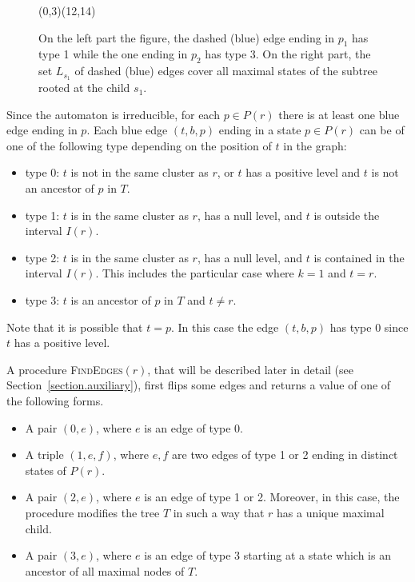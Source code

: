 \documentclass[11pt,a4paper]{article}
\def\T{{T}}
\begin{document}
\begin{figure}[htbp]
{\begin{VCPicture}{(0,3)(12,14)}
{
}
\end{VCPicture}}
        \caption{On the left part the figure, the dashed (blue) edge
          ending in $p_1$ has type 1 while the one ending in $p_2$ has
          type 3. On the right part, the set $L_{s_1}$ of dashed
          (blue) edges cover all maximal states of the subtree rooted
          at the child $s_1$.  }\label{figure.tree}
\end{figure}


Since the automaton is irreducible, for each $p \in P(r)$ there is at
least one blue edge ending in $p$. Each blue edge $(t,b,p)$ ending in
a state $p \in P(r)$ can be of one of the following type depending
on the position of $t$ in the graph:
\begin{itemize}
\item type 0: $t$ is not in the same cluster as $r$, or $t$ has a
  positive level and $t$ is not an ancestor of $p$ in $\T$.
\item type 1: $t$ is in the same cluster as $r$, has a null level, and
  $t$ is outside the interval $I(r)$.
\item type 2: $t$ is in the same cluster as $r$, has a null level, and
  $t$ is contained in the interval $I(r)$. This includes the
  particular case where $k=1$ and $t=r$.
\item type 3: $t$ is an ancestor of $p$ in $\T$ and $t \neq r$.
\end{itemize}
Note that it is possible that $t=p$. In this case the edge $(t,b,p)$
has type 0 since $t$ has a positive level.

A procedure \textsc{FindEdges}$(r)$, that will be described later in
detail (see Section~\ref{section.auxiliary}), first flips some edges and returns
a value of one of the following forms.
\begin{itemize} 
\item A pair $(0,e)$, where $e$ is an edge of type 0.
\item A triple $(1,e,f)$, where $e,f$ are two edges of type 1 or 2
  ending in distinct states of $P(r)$.
\item A pair $(2,e)$, where $e$ is an edge of type 1 or 2.
Moreover, in this case, the procedure modifies the tree $\T$ in such a way
that $r$ has a unique maximal child.
\item A pair $(3,e)$, where $e$ is an edge of type 3 starting at a
  state which is an ancestor of all maximal nodes of $\T$.
\end{itemize}   
\end{document}
